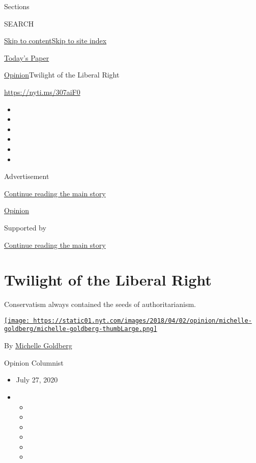 Sections

SEARCH

\protect\hyperlink{site-content}{Skip to
content}\protect\hyperlink{site-index}{Skip to site index}

\href{https://myaccount.nytimes.com/auth/login?response_type=cookie\&client_id=vi}{}

\href{https://www.nytimes.com/section/todayspaper}{Today's Paper}

\href{/section/opinion}{Opinion}\textbar{}Twilight of the Liberal Right

\href{https://nyti.ms/307aiF0}{https://nyti.ms/307aiF0}

\begin{itemize}
\item
\item
\item
\item
\item
\item
\end{itemize}

Advertisement

\protect\hyperlink{after-top}{Continue reading the main story}

\href{/section/opinion}{Opinion}

Supported by

\protect\hyperlink{after-sponsor}{Continue reading the main story}

\hypertarget{twilight-of-the-liberal-right}{%
\section{Twilight of the Liberal
Right}\label{twilight-of-the-liberal-right}}

Conservatism always contained the seeds of authoritarianism.

\href{https://www.nytimes.com/by/michelle-goldberg}{\texttt{[image: https://static01.nyt.com/images/2018/04/02/opinion/michelle-goldberg/michelle-goldberg-thumbLarge.png]}}

By \href{https://www.nytimes.com/by/michelle-goldberg}{Michelle
Goldberg}

Opinion Columnist

\begin{itemize}
\item
  July 27, 2020
\item
  \begin{itemize}
  \item
  \item
  \item
  \item
  \item
  \item
  \end{itemize}
\end{itemize}

